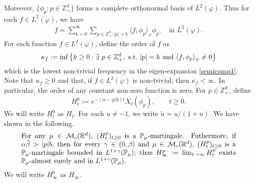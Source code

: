 \documentclass[12pt,a4paper]{amsart}
\theoremstyle{plain}
\theoremstyle{definition}
\numberwithin{equation}{section}
\begin{document}
Moreover, $\{\phi_p: p \in \mathbb Z_+^d\}$ forms a complete orthonormal basis of $L^2(\varphi)$.
Thus for each $f\in L^2(\varphi)$, we have
\begin{align}
  \label{semicomp1}
  f
  = \sum_{k=0}^{\infty}\sum_{p\in \mathbb Z_+^d:|p|=k}\langle f, \phi_p \rangle_{\varphi} \phi_p
  , \quad \text{in~} L^2(\varphi).
\end{align}
For each function $f\in L^2(\varphi)$, define the order of $f$ as
\[
  \kappa_f
  := \inf \left \{k\geq 0: \exists ~ p\in \mathbb Z_+^d , {\rm ~s.t.~} |p|=k {\rm ~and~}  \langle f, \phi_p \rangle_{\varphi}\neq 0\right \}
\]
which is the lowest non-trivial frequency in the eigen-expansion \eqref{semicomp1}.
Note that $ \kappa_f\geq 0$ and that, if $f\in L^2(\varphi)$ is non-trivial, then $\kappa_f<\infty$.
In particular, the order of any constant non-zero function is zero.
For $p\in \mathbb{Z}_+^d$, define
\[
  H_t^p
  := e^{-(\alpha-|p|b)t}X_t(\phi_p), \qquad t\geq 0.
\]
We will write $H^0_t$ as $H_t$.
For each $u \neq -1$, we write $\tilde u = u/(1+ u)$.
We have shown in \cite[Lemma 3.2]{RenSongSunZhao2019Stable} the following.
\begin{equation}\label{eq:Hinfty}
\begin{minipage}{0.9\textwidth}
	For any $\mu\in \mathcal M_c(\mathbb R^d)$, $(H_t^p)_{t\geq 0}$ is a $\mathbb{P}_{\mu}$-martingale.
	Futhermore, if $\alpha \tilde \beta>|p|b$, then for every $\gamma\in (0, \beta)$ and $\mu\in \mathcal M_c(\mathbb R^d)$,  $(H_t^p)_{t\geq 0}$ is a $\mathbb{P}_{\mu}$-martingale bounded in $L^{1+\gamma}(\mathbb{P}_{\mu})$;
	thus $H^p_{\infty}:=\lim_{t\rightarrow \infty}H_t^p$ exists $\mathbb{P}_{\mu}$-almost surely and in $L^{1+\gamma}(\mathbb P_\mu)$.
\end{minipage}
\end{equation}
We will write $H^0_\infty$ as $H_\infty$. 
\end{document}
